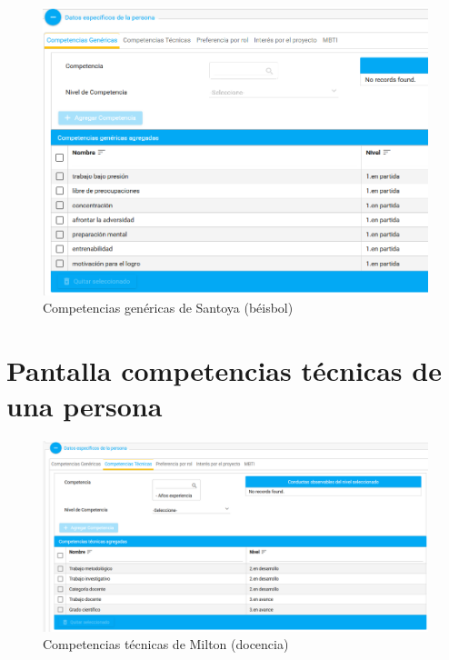 {\begin{figure}[H]
	\centering
	\includegraphics[width=\textwidth]{figuras/beisbol_santoya_compg.png}
	\caption{Competencias genéricas de Santoya (béisbol)} \label{fig:comp_genericas_beisbol}
\end{figure}


\chapter{Pantalla competencias técnicas de una persona}
\begin{figure}[H]
	\centering
	\includegraphics[width=\textwidth]{figuras/milton_competencias_tecnicas.png}
	\caption{Competencias técnicas de Milton (docencia)} \label{fig:comp_tecnicas_docencia}
\end{figure}

}
